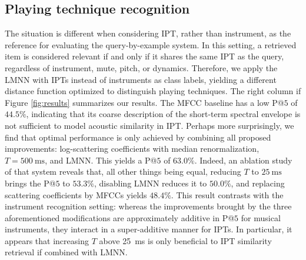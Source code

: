 \subsection{Playing technique recognition}

The situation is different when considering IPT, rather than instrument, as the reference for evaluating the query-by-example system.
In this setting, a retrieved item is considered relevant if and only if it shares the same IPT as the query, regardless of instrument, mute, pitch, or dynamics.
Therefore, we apply the LMNN with IPTs instead of instruments as class labels, yielding a different distance function optimized to distinguish playing techniques.
The right column if Figure \ref{fig:results} summarizes our results.
The MFCC baseline has a low P@$5$ of $44.5\%$, indicating that its coarse description of the short-term spectral envelope is not sufficient to model acoustic similarity in IPT.
Perhaps more surprisingly, we find that optimal performance is only achieved by combining all proposed improvements: log-scattering coefficients with median renormalization, $T=\SI{500}{\milli\second}$, and LMNN.
This yields a P@$5$ of $63.0\%$.
Indeed, an ablation study of that system reveals that, all other things being equal, reducing $T$ to $\SI{25}{\milli\second}$ brings the P@$5$ to $53.3\%$, disabling LMNN reduces it to $50.0\%$, and replacing scattering coefficients by MFCCs yields $48.4\%$.
This result contrasts with the instrument recognition setting: whereas the improvements brought by the three aforementioned modifications are approximately additive in P@$5$ for musical instruments, they interact in a super-additive manner for IPTs.
In particular, it appears that increasing $T$ above \SI{25}{\milli\second} is only beneficial to IPT similarity retrieval if combined with LMNN.


